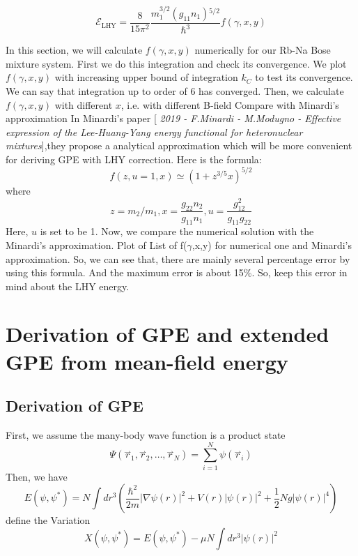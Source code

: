 \begin{equation}\mathcal{E}_{\text{LHY}}=\frac{8}{15\pi ^2}\frac{m_1^{3/2}\left(g_{11}n_1\right){}^{5/2}}{\hbar ^3}f(\gamma ,x,y)\end{equation}


In this section, we will calculate $f(\gamma ,x,y)$ numerically for our Rb-Na Bose mixture system.
First we do this integration and check its convergence. We plot $f(\gamma ,x,y)$ with increasing upper bound of integration $k_C$ to test its convergence.
We can say that integration up to order of 6 has converged. 
Then, we calculate $f(\gamma ,x,y)$ with different $x$, i.e. with different B-field
Compare with Minardi's approximation
In Minardi's paper [\textit{ 2019 - F.Minardi - M.Modugno - Effective expression of the Lee-Huang-Yang energy functional for heteronuclear mixtures}],they propose a analytical approximation which will be more convenient for deriving GPE with LHY correction. Here is the formula:
\begin{equation}
f(z,u=1,x)\simeq \left(1+z^{3/5}x\right)^{5/2}
\end{equation}
where
\begin{equation}
z=m_2/m_1, x=\frac{g_{22}n_2}{g_{11}n_1},u=\frac{g_{12}^2}{g_{11}g_{22}}
\end{equation}
Here, $u$ is set to be 1.
Now, we compare the numerical solution with the Minardi's approximation.
Plot of List of f($\gamma $,x,y) for numerical one and Minardi's approximation.
So, we can see that, there are mainly several percentage error by using this formula. And the maximum error is about 15$\%$. So, keep this error
in mind about the LHY energy.

\section{Derivation of GPE and extended GPE from mean-field energy}

\subsection{Derivation of GPE}

First, we assume the many-body wave function is a product state
\begin{equation}
\Psi \left(\overset{\rightharpoonup }{r}_1,\overset{\rightharpoonup }{r}_2,\ldots  ,\overset{\rightharpoonup }{r}_N\right)=\sum _{i=1}^N \psi \left(\overset{\rightharpoonup}{r}_i\right)
\end{equation}
Then, we have
\begin{equation}
E\left(\psi ,\psi ^*\right)=N\int dr^3\left(\frac{\hbar ^2}{2m}\left| \nabla \psi (r)\right| ^2+V(r)\left| \psi (r)\right| ^2+\frac{1}{2}N g\left|\psi (r)\right| ^4\right)
\end{equation}
define the Variation
\begin{equation}X\left(\psi ,\psi ^*\right)=E\left(\psi ,\psi ^*\right)-\mu  N\int dr^3\left| \psi (r)\right| ^2\end{equation}

